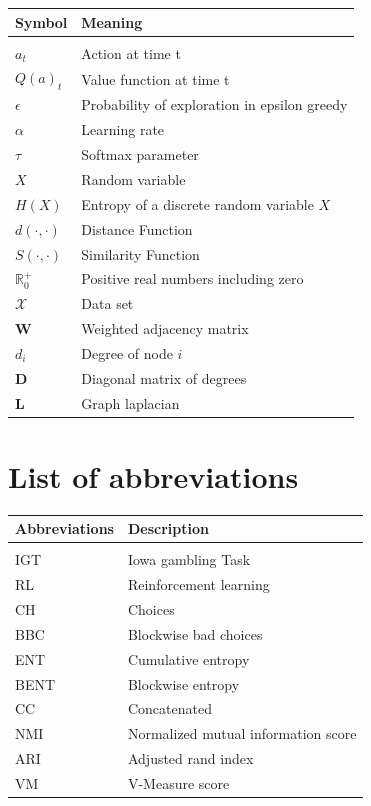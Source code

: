 \documentclass[12pt,a4paper,bibliography=totocnumbered,listof=totocnumbered]{scrartcl}
\begin{document}
\begin{tabular}{p{6cm}p{9cm}}
\textbf{Symbol} 		& 		\textbf{Meaning} \\
\midrule
\vspace{0.3cm} & \vspace{0.3cm} 			\\
$a_t$				  & Action at time t			\\
$Q(a)_t$	& Value function at time t \\
$\epsilon$			& Probability of exploration in epsilon greedy \\
$\alpha$ & Learning rate \\ 
$\tau$ & Softmax parameter \\
$X$ & Random variable \\
$H(X) $ &  Entropy of a  discrete random variable $X$ \\ 
$d(\cdot,\cdot)$ & Distance Function \\
$S(\cdot,\cdot)$ & Similarity Function \\
$ \mathbb{R}_0^+$ & Positive real numbers including zero \\
$\mathcal{X}$ & Data set \\ 
\textbf{W} & Weighted adjacency matrix \\
$d_i$ & Degree of node $i$ \\
\textbf{D} & Diagonal matrix of degrees \\
\textbf{L} & Graph laplacian \\
\end{tabular}

\pagebreak


\section{List of abbreviations}

\begin{tabular}{p{6cm}p{9cm}}
\textbf{Abbreviations} & \textbf{Description} 										\\
\midrule
\vspace{0.3cm} & \vspace{0.3cm} 														\\ 
IGT & Iowa gambling Task \\
RL & Reinforcement learning \\
CH & Choices \\
BBC & Blockwise bad choices \\
ENT & Cumulative entropy \\
BENT & Blockwise entropy \\
CC & Concatenated \\
NMI & Normalized mutual information score \\
ARI & Adjusted rand index \\
VM & V-Measure score

\end{tabular}
\end{document}
